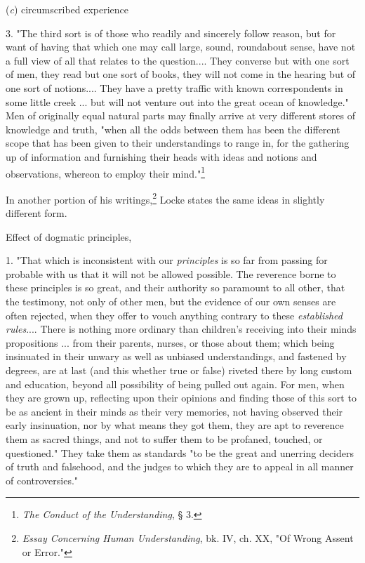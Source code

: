 \documentclass[letterpaper]{book}
\begin{document}
(\emph{c}) circumscribed experience

3. "The third sort is of those who readily and sincerely follow reason,
but for want of having that which one may call large, sound, roundabout
sense, have not a full view of all that relates to the question.... They
converse but with one sort of men, they read but one sort of books, they
will not come in the hearing but of one sort of notions.... They have a
pretty traffic with known correspondents in some little creek ... but
will not venture out into the great ocean of knowledge." Men of
originally equal natural parts may finally arrive at very different
stores of knowledge and truth, "when all the odds between them has been
the different scope that has been given to their understandings to range
in, for the gathering up of information and furnishing their heads with
ideas and notions and observations, whereon to employ their
mind."\footnote{\emph{The Conduct of the Understanding}, § 3.}



In another portion of his
writings,\footnote{\emph{Essay Concerning Human Understanding}, bk. IV, ch. XX, "Of Wrong Assent or Error."}
Locke states the same ideas in slightly different form.

Effect of dogmatic principles,

1. "That which is inconsistent with our \emph{principles} is so far from
passing for probable with us that it will not be allowed possible. The
reverence borne to these principles is so great, and their authority so
paramount to all other, that the testimony, not only of other men, but
the evidence of our own senses are often rejected, when they offer to
vouch anything contrary to these \emph{established rules}.... There is
nothing more ordinary than children's receiving into their minds
propositions ... from their parents, nurses, or those about them; which
being insinuated in their unwary as well as unbiased understandings, and
fastened by degrees, are at last (and this whether true or false)
riveted there by long custom and education, beyond all possibility of
being pulled out again. For men, when they are grown up, reflecting upon
their opinions and finding those of this sort to be as ancient in their
minds as their very memories, not having observed their early
insinuation, nor by what means they got them, they are apt to reverence
them as sacred things, and not to suffer them to be profaned, touched,
or questioned." They take them as standards "to be the great and
unerring deciders of truth and falsehood, and the judges to which they
are to appeal in all manner of controversies."
\end{document}
